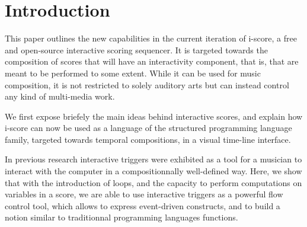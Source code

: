 \documentclass{article}
\title{\papertitle}
\begin{document}
%
\capstartfalse
\maketitle
\capstarttrue
%
\begin{abstract}
     The development and authoring of interactive music or applications, such as user interfaces for arts \& exhibitions
     has traditionally been done with tools that pertain to two broad metaphors. 
     Cue-based environments work by making groups of parameters and sending them to remote devices, 
     while more interactive applications are generally written in generic art-oriented 
     programming environments, such as Max/MSP, Processing or OpenFrameworks.
     In this paper, we argue about the specific issues that arise in such environments, and we present 
     the current version of the i-score sequencer. It is an extensive software suite that bridges
     the gap between time-based, logic-based and flow-based interactive application authoring tools. 
     This is done in a single cohesive graphical user interface, built upon a few simple and novel primitives that give to the composer the expressive power of structured programming, in a time line adapted to the notation of parameter-oriented interactive music.    
\end{abstract}
%

\section{Introduction}\label{sec:introduction}
This paper outlines the new capabilities in the current iteration of i-score, 
a free and open-source interactive scoring sequencer.
It is targeted towards the composition of scores that will have 
an interactivity component, that is, that are meant to be performed 
to some extent.
While it can be used for music composition, it is not restricted to solely auditory arts
but can instead control any kind of multi-media work.

We first expose briefely the main ideas behind interactive scores, and explain 
how i-score can now be used as a language of the structured programming language 
family, targeted towards temporal compositions, in a visual time-line interface.

In previous research\cite{hogue2014ossia} interactive triggers were exhibited as a tool for a musician 
to interact with the computer in a compositionnally well-defined way.
Here, we show that with the introduction of loops, and the capacity to perform computations 
on variables in a score, we are able to use interactive triggers as a powerful flow control tool, which 
allows to express event-driven constructs, and to build a notion similar to traditionnal programming 
languages functions.
\end{document}
